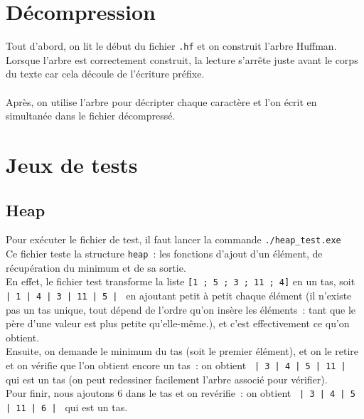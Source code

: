 \documentclass{article}
\begin{document}
  \section*{Décompression}
  Tout d'abord, on lit le début du fichier \texttt{.hf} et on construit l'arbre Huffman. Lorsque l'arbre est correctement construit, la lecture s'arrête juste avant le corps du texte car cela découle de l'écriture préfixe. \\ \\
  Après, on utilise l'arbre pour décripter chaque caractère et l'on écrit en simultanée dans le fichier décompressé.

  \section*{Jeux de tests}
  \subsection*{Heap}
  Pour exécuter le fichier de test, il faut lancer la commande \texttt{./heap\_test.exe} \\
  Ce fichier teste la structure \texttt{heap}~: les fonctions d'ajout d'un élément, de récupération du minimum et de sa sortie. \\
  En effet, le fichier test transforme la liste \texttt{[1 ; 5 ; 3 ; 11 ; 4]} en un tas, soit \texttt{ | 1 | 4 | 3 | 11 | 5 | } en ajoutant petit à petit chaque élément (il n'existe pas un tas unique, tout dépend de l'ordre qu'on insère les éléments~: tant que le père d'une valeur est plus petite qu'elle-même.), et c'est effectivement ce qu'on obtient. \\
  Ensuite, on demande le minimum du tas (soit le premier élément), et on le retire et on vérifie que l'on obtient encore un tas~: on obtient \texttt{ | 3 | 4 | 5 | 11 | } qui est un tas (on peut redessiner facilement l'arbre associé pour vérifier). \\
  Pour finir, nous ajoutons $6$ dans le tas et on revérifie~: on obtient \texttt{ | 3 | 4 | 5 | 11 | 6 | } qui est un tas.
\end{document}
